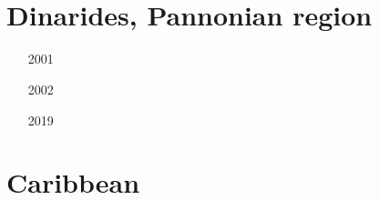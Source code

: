 \begin{small}
\begin{itemize}
\item[\nineteenninetyone]   
\item[\nineteenninetytwo]   
\item[\nineteenninetythree] 
\item[\nineteenninetyeight]
\item[\twothousand]         
\item[\twothousandfour] 
  \\
\item[\twothousandten] 
\item[\twothousandtwelve] 
\item[\twothousandthirteen] 
\item[\twothousandfourteen] 
\item[\twothousandnineteen] 
  \\
\end{itemize}
\end{small}


\section{Dinarides, Pannonian region} 

\begin{small}
\begin{itemize}
\item[2001]
\item[2002]
\item[2019]
\end{itemize}
\end{small}


\section{Caribbean} 

